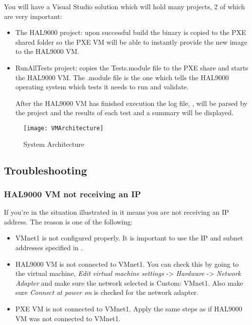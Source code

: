 \begin{appendices}
You will have a Visual Studio solution which will hold many projects, 2 of which are very important:
\begin{itemize}
	\item The HAL9000 project: upon successful build the binary is copied to the PXE shared folder
so the PXE VM will be able to instantly provide the new image to the HAL9000 VM.

	\item RunAllTests project: copies the Tests.module file to the PXE share and starts the HAL9000
VM. The .module file is the one which tells the HAL9000 operating system which tests it needs to run
and validate.

	After the HAL9000 VM has finished execution the log file, , will be parsed by
the project and the results of each test and a summary will be displayed.
\end{itemize}

\begin{figure}
	\centering
	\texttt{[image: VMArchitecture]}
		\caption{System Architecture}
	\label{fig:SystemArch}
\end{figure}

\subsection{Troubleshooting}

\subsubsection{HAL9000 VM not receiving an IP}

If you're in the situation illustrated in  it means you are not receiving an
IP address. The reason is one of the following:
\begin{itemize}
	\item VMnet1 is not configured properly. It is important to use the IP and subnet addresses
specified in .

	\item HAL9000 VM is not connected to VMnet1. You can check this by going to the virtual machine,
\textit{Edit virtual machine settings} -> \textit{Hardware} -> \textit{Network Adapter} and make
sure the network selected is Custom: VMnet1. Also make sure \textit{Connect at power on} is checked
for the network adapter.

	\item PXE VM is not connected to VMnet1. Apply the same steps as if HAL9000 VM was not connected
to VMnet1.


\end{itemize}
\end{appendices}
